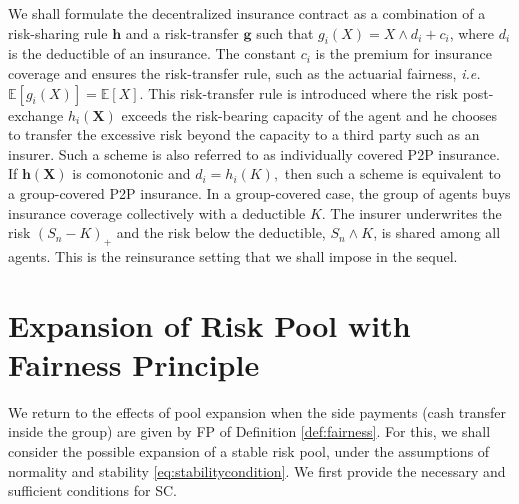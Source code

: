 \documentclass[fleqn,mnsc,nonblindrev]{informs4}
\begin{document}
We shall formulate the decentralized insurance contract as a combination of a risk-sharing rule $\mathbf{h}$ and a risk-transfer $\mathbf{g}$ such that $g_i(X)= X \wedge d_i+c_i$, where $d_i$ is the deductible of an insurance. The constant $c_i$ is the premium for insurance coverage and ensures the risk-transfer rule, such as the actuarial fairness, {\it i.e.} $\mathbb{E}[g_i(X)]=\mathbb{E}[X]$. This risk-transfer rule is introduced where the risk post-exchange $h_i(\mathbf{X})$ exceeds the risk-bearing capacity of the agent and he chooses to transfer the excessive risk beyond the capacity to a third party such as an insurer. Such a scheme is also referred to as individually covered P2P insurance. If $\mathbf{h}(\mathbf{X})$ is comonotonic and $d_i=h_i(K),$ then such a scheme is equivalent to a group-covered P2P insurance. In a group-covered case, the group of agents buys insurance coverage collectively with a deductible $K$. The insurer underwrites the risk $(S_n-K)_+$ and the risk below the deductible, $S_n\wedge K$, is shared among all agents. This is the reinsurance setting that we shall impose in the sequel. 

\section{Expansion of Risk Pool with Fairness Principle}\label{sec:expansion}

We return to the effects of pool expansion when the side payments (cash transfer inside the group) are given by FP of Definition \ref{def:fairness}. For this, we shall consider the possible expansion of a stable risk pool, under the assumptions of normality and stability \eqref{eq:stabilitycondition}. We first provide the necessary and sufficient conditions for SC. 
\end{document}
